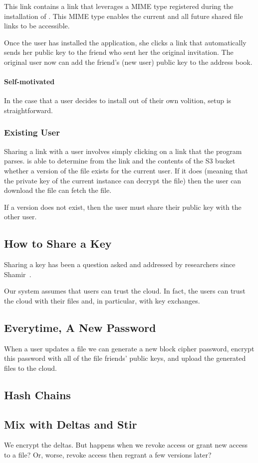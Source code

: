 This link contains a link that leverages a MIME type registered during
the installation of \name. This MIME type enables the current and all
future shared file links to be accessible. 

Once the user has installed the application, she clicks a link that
automatically sends her public key to the friend who sent her the
original invitation. The original user now can add the friend's (new
\name user) public key to the \name address book.

\paragraph{Self-motivated} In the case that a user decides to install
\name out of their own volition, setup is straightforward.

\subsubsection*{Existing \name User}

Sharing a link with a user involves simply clicking on a link that the
\name program parses. \name is able to determine from the link and the
contents of the S3 bucket whether a version of the file exists for the
current user. If it does (meaning that the private key of the current
\name instance can decrypt the file) then the user can download the
file can fetch the file. 

If a version does not exist, then the user must share their public key
with the other user.

\subsection{How to Share a Key}

Sharing a key has been a question asked and addressed by researchers
since Shamir~\cite{shamir}.

Our system assumes that users can trust the cloud. In fact, the users
can trust the cloud with their files and, in particular, with key
exchanges.

\subsection{Everytime, A New Password}

When a user updates a file we can generate a new block cipher
password, encrypt this password with all of the file friends' public
keys, and upload the generated files to the cloud.

\subsection{Hash Chains}


\subsection{Mix with Deltas and Stir}

We encrypt the deltas. But happens when we revoke access or grant new
access to a file? Or, worse, revoke access then regrant a few versions
later?